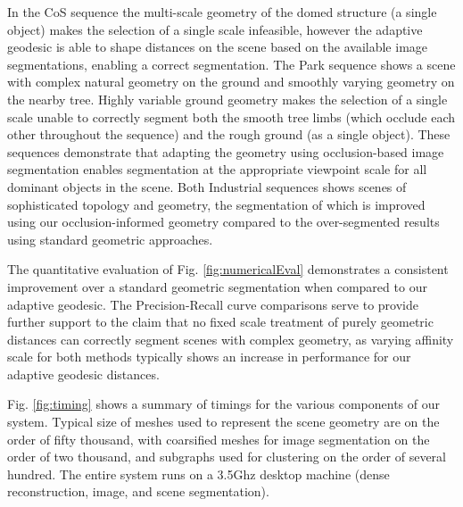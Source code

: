 In the CoS sequence the multi-scale geometry of the domed structure (a single object) makes the selection of a single scale infeasible, 
however the adaptive geodesic is able to shape distances on the scene based on the available image segmentations, enabling a correct segmentation. The Park sequence shows a scene with complex natural geometry on the ground and smoothly varying geometry on the nearby
tree. Highly variable ground geometry makes the selection of a single scale unable to correctly segment both the smooth tree
limbs (which occlude each other throughout the sequence) and the rough ground (as a single object).
These sequences demonstrate that adapting the geometry using
occlusion-based image segmentation enables segmentation at the appropriate viewpoint scale for all dominant objects in the scene. Both
Industrial sequences shows scenes of sophisticated
topology and geometry, the segmentation of which is improved using our occlusion-informed geometry compared to the over-segmented results using 
standard geometric approaches.


The quantitative evaluation of Fig. \ref{fig:numericalEval} demonstrates a consistent improvement
over a standard geometric segmentation when compared to our adaptive geodesic.
The Precision-Recall curve comparisons serve to provide further support to the claim that no fixed scale treatment of purely geometric distances can correctly segment scenes with complex geometry, as varying affinity scale
for both methods typically shows an increase in performance for our adaptive geodesic distances.

Fig. \ref{fig:timing} shows a summary of timings for the various components of our system. Typical
size of meshes used to represent the scene geometry are on the order of fifty thousand, with
coarsified meshes for image segmentation on the order of two thousand, and subgraphs used for
clustering on the order of several hundred. The entire system runs on a 3.5Ghz desktop
machine (dense reconstruction, image, and scene segmentation).

